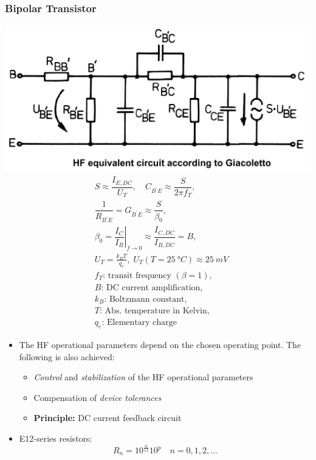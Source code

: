 \subsubsection{Bipolar Transistor}
\includegraphics[width=.3\paperheight]{content/hfcomp/pictures/bipolar_transistor_giacoletto.png}
\begin{align*}
    &S \approx \dfrac{I_{E,DC}}{U_T}, \quad C_{B^\prime E} \approx \dfrac{S}{2\pi f_T},\\
    &\dfrac{1}{R_{B^\prime E}} = G_{B^\prime E} \approx \dfrac{S}{\beta_0},\\
    &\beta_0 = \left.\dfrac{I_C}{I_B}\right|_{f\to0} \approx \dfrac{I_{C,DC}}{I_{B,DC}} = B,\\
    &U_T = \frac{k_B T}{q_e}, \; U_T(T=\SI{25}{\degree C}) \approx \SI{25}{mV}\\
    &f_T\text{: transit frequency }(\beta = 1),\\
    &B\text{: DC current amplification},\\
    &k_B\text{: Boltzmann constant},\\
    &T\text{: Abs. temperature in Kelvin},\\
    &q_e\text{: Elementary charge}
\end{align*}
\begin{itemize}
    \itemsep0pt
    \item The HF operational parameters depend on the chosen operating point. The following is also achieved:
    \begin{itemize}
        \itemsep0pt
        \item \textit{Control} and \textit{stabilization} of the HF operational parameters
        \item Compensation of \textit{device tolerances}
        \item \textbf{Principle:} DC current feedback circuit
    \end{itemize}
\item E12-series resistors:
    \begin{equation*}
        R_n = 10^\frac{n}{12} 10^p \quad n=0,1,2,...
    \end{equation*}
\end{itemize}

